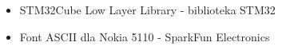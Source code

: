 \documentclass{article}
\begin{document}
\begin{itemize}
    \item STM32Cube Low Layer Library - biblioteka STM32
    \item Font ASCII dla Nokia 5110 - SparkFun Electronics
\end{itemize}


%
%
%
%
%
%
\end{document}
